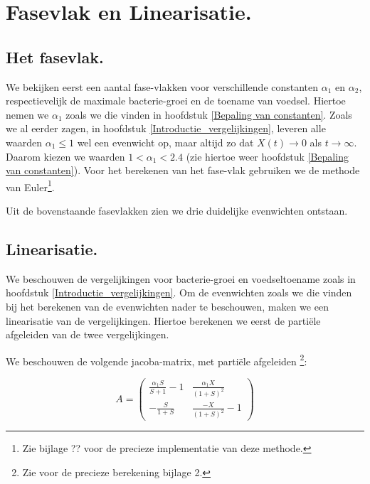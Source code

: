 
\chapter{Fasevlak en Linearisatie.}
\label{Fasevlak en Linearisatie}

\section{Het fasevlak.}

We bekijken eerst een aantal fase-vlakken voor verschillende constanten $\alpha_1$ en $\alpha_2$, respectievelijk de maximale bacterie-groei en de toename van voedsel. Hiertoe nemen we $\alpha_1$ zoals we die vinden in hoofdstuk \ref{Bepaling van constanten}. Zoals we al eerder zagen, in hoofdstuk \ref{Introductie_vergelijkingen}, leveren alle waarden $ \alpha_1 \leq 1$ wel een evenwicht op, maar altijd zo dat $X(t) \to 0$ als $t\to\infty$. Daarom kiezen we waarden $1 < \alpha_1  < 2.4$ (zie hiertoe weer hoofdstuk \ref{Bepaling van constanten}). Voor het berekenen van het fase-vlak gebruiken we de methode van Euler\footnote{Zie bijlage ?? voor de precieze implementatie van deze methode.}.




Uit de bovenstaande fasevlakken zien we drie duidelijke evenwichten ontstaan. 


\section{Linearisatie.}

We beschouwen de vergelijkingen voor bacterie-groei en voedseltoename zoals in hoofdstuk \ref{Introductie_vergelijkingen}. Om de evenwichten zoals we die vinden bij het berekenen van de evenwichten nader te beschouwen, maken we een linearisatie van de vergelijkingen. Hiertoe berekenen we eerst de parti\"ele afgeleiden van de twee vergelijkingen. 

We beschouwen de volgende jacoba-matrix, met parti\"ele afgeleiden \footnote{Zie voor de precieze berekening bijlage 2.}: %

\begin{equation*}
	A = 
	\begin{pmatrix}
		\frac{\alpha_1 S}{S + 1} - 1 & \frac{\alpha_1 X}{(1 + S)^2} \\
		-\frac{S}{1 + S} & \frac{-X}{(1 + S)^2} - 1
	\end{pmatrix}
\end{equation*}

